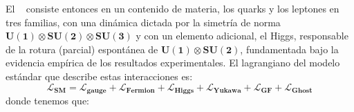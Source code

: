 El \ME ~ consiste entonces en un contenido de materia, los quarks y los leptones en tres familias, con una dinámica dictada por la simetría de norma $\mathbf{U(1) \otimes SU(2) \otimes SU(3)}$ y con un elemento adicional, el Higgs, responsable de la rotura (parcial) espontánea de  $\mathbf{U(1) \otimes SU(2)}$, fundamentada bajo la evidencia empírica de los resultados experimentales. El lagrangiano del modelo estándar que describe estas interacciones es:
\begin{equation}
\mathcal{L}_{\mathbf{SM}} = \mathcal{L}_{\mathbf{gauge}} + \mathcal{L}_{\mathbf{Fermion}} + \mathcal{L}_{\mathbf{Higgs}} + \mathcal{L}_{\mathbf{Yukawa}} + \mathcal{L}_{\mathbf{GF}} + \mathcal{L}_{\mathbf{Ghost}} 
\end{equation}
donde tenemos que:
